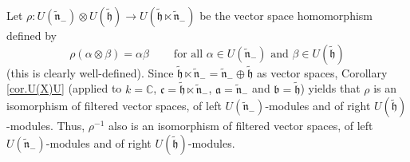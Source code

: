 \documentclass[etingof-lie.tex]{subfiles}
\begin{document}
Let $\rho:U\left(  \widetilde{\mathfrak{n}}_{-}\right)  \otimes U\left(
\widetilde{\mathfrak{h}}\right)  \rightarrow U\left(  \widetilde{\mathfrak{h}%
}\ltimes\widetilde{\mathfrak{n}}_{-}\right)  $ be the vector space
homomorphism defined by%
\[
\rho\left(  \alpha\otimes\beta\right)  =\alpha\beta
\ \ \ \ \ \ \ \ \ \ \text{for all }\alpha\in U\left(  \widetilde{\mathfrak{n}%
}_{-}\right)  \text{ and }\beta\in U\left(  \widetilde{\mathfrak{h}}\right)
\]
(this is clearly well-defined). Since $\widetilde{\mathfrak{h}}\ltimes
\widetilde{\mathfrak{n}}_{-}=\widetilde{\mathfrak{n}}_{-}\oplus
\widetilde{\mathfrak{h}}$ as vector spaces, Corollary \ref{cor.U(X)U} (applied
to $k=\mathbb{C}$, $\mathfrak{c}=\widetilde{\mathfrak{h}}\ltimes
\widetilde{\mathfrak{n}}_{-}$, $\mathfrak{a}=\widetilde{\mathfrak{n}}_{-}$ and
$\mathfrak{b}=\widetilde{\mathfrak{h}}$) yields that $\rho$ is an isomorphism
of filtered vector spaces, of left $U\left(  \widetilde{\mathfrak{n}}%
_{-}\right)  $-modules and of right $U\left(  \widetilde{\mathfrak{h}}\right)
$-modules. Thus, $\rho^{-1}$ also is an isomorphism of filtered vector spaces,
of left $U\left(  \widetilde{\mathfrak{n}}_{-}\right)  $-modules and of right
$U\left(  \widetilde{\mathfrak{h}}\right)  $-modules.
\end{document}
